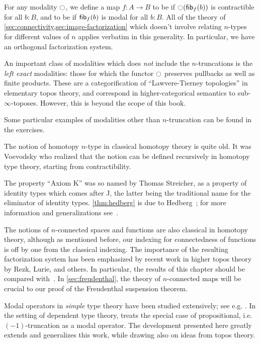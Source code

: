 For any modality $\ocircle$, we define a map $f:A\to B$ to be  if $\ocircle({\mathsf{fib}}_{f}(b))$ is contractible for all $b:B$, and to be  if ${\mathsf{fib}}_{f}(b)$ is modal for all $b:B$.
All of the theory of \autoref{sec:connectivity,sec:image-factorization} which doesn't involve relating $n$-types for different values of $n$ applies verbatim in this generality.
In particular, we have an orthogonal factorization system.

An important class of modalities which does \emph{not} include the $n$-truncations is the \emph{left exact} modalities: those for which the functor $\ocircle$ preserves pullbacks as well as finite products.
These are a categorification of ``Lawvere-Tierney topologies'' in elementary topos theory, and correspond in higher-categorical semantics to sub-$\infty$-toposes.
However, this is beyond the scope of this book.

Some particular examples of modalities other than $n$-truncation can be found in the exercises.


\sectionNotes

The notion of homotopy $n$-type in classical homotopy theory is quite old.
It was Voevodsky who realized that the notion can be defined recursively in homotopy type theory, starting from contractibility.

The property ``Axiom K'' was so named by Thomas Streicher, as a property of identity types which comes after J, the latter being the traditional name for the eliminator of identity types.
\autoref{thm:hedberg} is due to Hedberg~\cite{hedberg1998coherence}; for more information and generalizations see~\cite{krausgeneralizations}.

The notions of $n$-connected spaces and functions are also classical in homotopy theory, although as mentioned before, our indexing for connectedness of functions is off by one from the classical indexing.
The importance of the resulting factorization system has been emphasized by recent work in higher topos theory by Rezk, Lurie, and others.
In particular, the results of this chapter should be compared with~\cite[\S6.5.1]{lurie:higher-topoi}.
In \autoref{sec:freudenthal}, the theory of $n$-connected maps will be crucial to our proof of the Freudenthal suspension theorem.

Modal operators in \emph{simple} type theory have been studied extensively; see e.g. \cite{modalTT}.  In the setting of dependent type theory, \cite{ab:bracket-types} treats the special case of propositional, i.e.\ $(-1)$-truncation as a modal operator.  The development presented here greatly extends and generalizes this work, while drawing also on ideas from topos theory.



